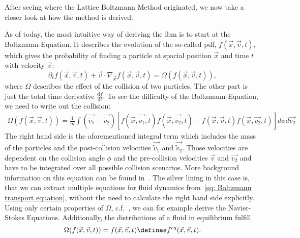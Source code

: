 
After seeing where the Lattice Boltzmann Method originated, we now take a closer look at how the method is derived.

As of today, the most intuitive way of deriving the \gls{lbm} is to start at the Boltzmann-Equation.
It describes the evolution of the so-called \gls{pdf}, $f(\vec{x},\vec{v},t)$, which gives the probability of finding a particle at spacial position $\vec{x}$ and time $t$ with velocity $\vec{v}$:
\begin{equation}
  \label{eq: Boltzmann transport equation}
  \partial_t f(\vec{x},\vec{v},t) + \vec{v}\cdot \nabla_\vec{x} f(\vec{x},\vec{v},t) = \Omega\left(f(\vec{x},\vec{v},t)\right),
\end{equation}
where $\Omega$ describes the effect of the collision of two particles. The other part is just the total time derivative $\frac{\text{d}f}{\text{d}t}$. To see the difficulty of the Boltzmann-Equation, we need to write out the collision:
\begin{equation}
  \label{eq: Collision of boltzmann equation}
  \begin{aligned}
 \Omega\left(f(\vec{x},\vec{v},t)\right) =\frac{1}{m}
  \int \left( \vec{\tilde{v}_1}-\vec{\tilde{v}_2}\right)
  \left[
    f(\vec{x},\vec{\tilde{v}_1},t)f(\vec{x},\vec{\tilde{v}_2},t)
    -f(\vec{x},\vec{v},t)f(\vec{x},\vec{v_2},t)
  \right] d\phi d\vec{v_2}
\end{aligned}
\end{equation}
The right hand side is the aforementioned integral term which includes the mass of the particles and the post-collision velocities $\vec{\tilde{v}_1}$ and $\vec{\tilde{v}_2}$.
Those velocities are dependent on the collision angle $\phi$ and the pre-collision velocities $\vec{v}$ and $\vec{v_2}$ and have to be integrated over all possible collision scenarios.
More background information on this equation can be found in~\cite{harris2004introduction}.
The silver lining in this case is, that we can extract multiple equations for fluid dynamics from~\eqref{eq: Boltzmann transport equation}, without the need to calculate the right hand side explicitly.
Using only certain properties of $\Omega$, c.f.~\cite[Pages 26 ff.]{harris2004introduction}, we can for example derive the Navier-Stokes Equations.
Additionally, the distributions of a fluid in equilibrium fulfill
\begin{equation}
  \Omega(f(\vec{x},\vec{v},t)) = f(\vec{x},\vec{v},t) \defines f^{eq}(\vec{x},\vec{v},t).
\end{equation}
